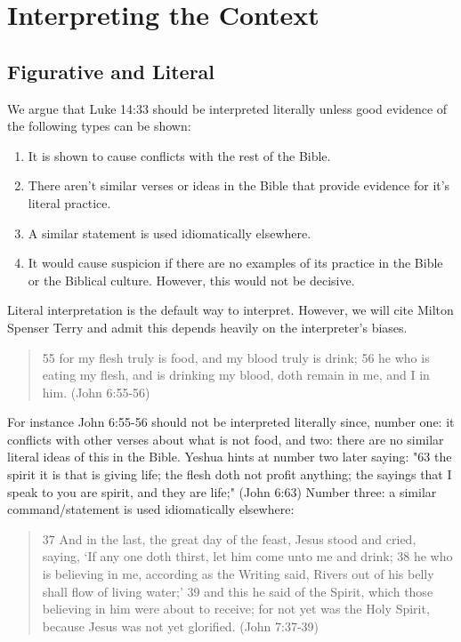 \documentclass[11pt]{article}
\begin{document}
\section{Interpreting the Context}

\subsection{Figurative and Literal} \label{the figurative and literal}
We argue that Luke 14:33 should be interpreted literally unless good evidence of the following types can be shown: 
\begin{enumerate}
\item It is shown to cause conflicts with the rest of the Bible. 
\item There aren't similar verses or ideas in the Bible that provide evidence for it's literal practice. 
\item A similar statement is used idiomatically elsewhere. 
\item It would cause suspicion if there are no examples of its practice in the Bible or the Biblical culture. However, this would not be decisive.
 \end{enumerate}
Literal interpretation is the default way to interpret. However, we will cite Milton Spenser Terry and admit this depends heavily on the interpreter's biases.\cite{mt}
\begin{quote}
55 for my flesh truly is food, and my blood truly is drink; 56 he who is eating my flesh, and is drinking my blood, doth remain in me, and I in him. (John 6:55-56) \end{quote}
For instance John 6:55-56 should not be interpreted literally since, number one: it conflicts with other verses about what is not food, and two: there are no similar literal ideas of this in the Bible. Yeshua hints at number two later saying: "63 the spirit it is that is giving life; the flesh doth not profit anything; the sayings that I speak to you are spirit, and they are life;" (John 6:63) Number three: a similar command/statement is used idiomatically elsewhere:
\begin{quote}
37 And in the last, the great day of the feast, Jesus stood and cried, saying, `If any one doth thirst, let him come unto me and drink;
38 he who is believing in me, according as the Writing said, Rivers out of his belly shall flow of living water;'
39 and this he said of the Spirit, which those believing in him were about to receive; for not yet was the Holy Spirit, because Jesus was not yet glorified. (John 7:37-39)
\end{quote}
\end{document}
